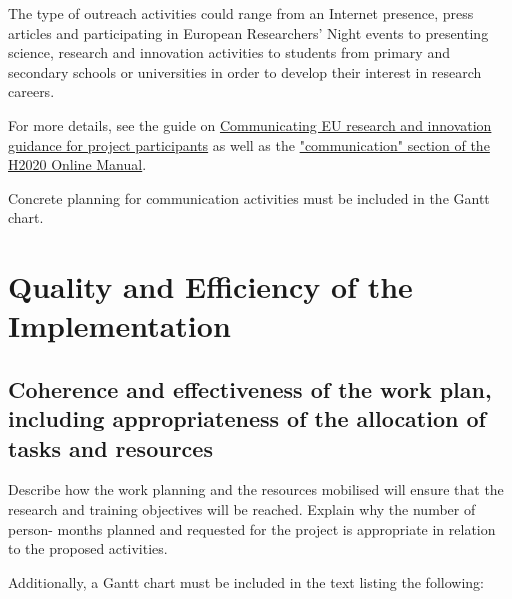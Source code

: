 \medskip\noindent
The type of outreach activities could range from an Internet presence, press articles
and participating in European Researchers' Night events to presenting science,
research and innovation activities to students from primary and secondary schools or
universities in order to develop their interest in research careers.

\medskip\noindent
For more details, see the guide on \href{http://ec.europa.eu/research/participants/data/ref/h2020/other/gm/h2020-guide-comm_en.pdf}
{Communicating EU research and innovation guidance for project participants}
as well as the
\href{http://ec.europa.eu/research/participants/docs/h2020-funding-guide/grants/grant-management/communication_en.htm}
{"communication" section of the H2020 Online Manual}.

\medskip\noindent
Concrete planning for communication activities must be included in the Gantt chart.




\section{Quality and Efficiency of the Implementation}
\label{sec:implementation}

\subsection{Coherence and effectiveness of the work plan, including appropriateness of the allocation of tasks and resources}
\label{sec:implementation_work_plan}

Describe how the work planning and the resources mobilised will ensure that the
research and training objectives will be reached. Explain why the number of person-
months planned and requested for the project is appropriate in relation to the proposed
activities.

\medskip\noindent
Additionally, a Gantt chart must be included in the text listing the following:

